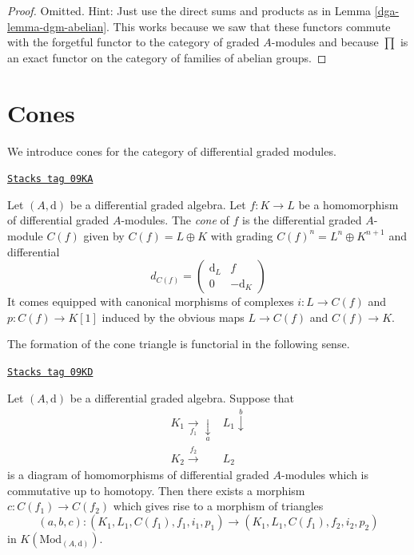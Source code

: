 \begin{proof}

Omitted. Hint: Just use the direct sums and products as in
Lemma \ref{dga-lemma-dgm-abelian}. This works because we saw that
these functors commute with the forgetful functor to the category
of graded $A$-modules and because $\prod$ is an exact functor
on the category of families of abelian groups.
\end{proof}

\section{Cones}
\label{dga-section-cones}
We introduce cones for the category of differential graded modules.

\begin{definition}[Cone]
\label{dga-definition-cone}
\href{https://stacks.math.columbia.edu/tag/09KA}{\texttt{Stacks tag 09KA}}

Let $(A, \text{d})$ be a differential graded algebra.
Let $f : K \to L$ be a homomorphism of differential graded $A$-modules.
The {\it cone} of $f$ is the differential graded $A$-module
$C(f)$ given by $C(f) = L \oplus K$ with grading
$C(f)^n = L^n \oplus K^{n + 1}$ and
differential
$$
d_{C(f)} =
\left(
\begin{matrix}
\text{d}_L & f \\
0 & -\text{d}_K
\end{matrix}
\right)
$$
It comes equipped with canonical morphisms of complexes $i : L \to C(f)$
and $p : C(f) \to K[1]$ induced by the obvious maps $L \to C(f)$
and $C(f) \to K$.
\end{definition}

The formation of the cone triangle is functorial in the following sense.

\begin{lemma}
\label{dga-lemma-functorial-cone}
\href{https://stacks.math.columbia.edu/tag/09KD}{\texttt{Stacks tag 09KD}}

Let $(A, \text{d})$ be a differential graded algebra.
Suppose that
$$
\begin{array}{cc}K_1 \underset{f_1}{\longrightarrow}\underset{a}{\downarrow} & L_1 \overset{b}{\downarrow} \\ K_2 \overset{f_2}{\longrightarrow} & L_2\end{array}
$$
is a diagram of homomorphisms of differential graded $A$-modules which is
commutative up to homotopy.
Then there exists a morphism $c : C(f_1) \to C(f_2)$ which gives rise to
a morphism of triangles
$$
(a, b, c) : (K_1, L_1, C(f_1), f_1, i_1, p_1) \to
(K_1, L_1, C(f_1), f_2, i_2, p_2)
$$
in $K(\text{Mod}_{(A, \text{d})})$.
\end{lemma}


